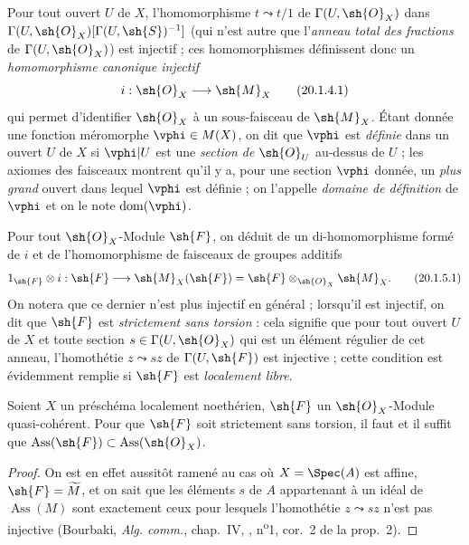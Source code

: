 \begin{env}[20.1.4]
Pour tout ouvert $U$ de $X$, l'homomorphisme $t\leadsto t/1$ de $\Gamma(U,\sh{O}_X)$ dans $\Gamma(U,\sh{O}_X)[\Gamma(U,\sh{S})^{-1}]$ (qui n'est autre que l'\emph{anneau total des fractions} de
$\Gamma(U,\sh{O}_X)$) est injectif ; ces homomorphismes définissent donc un \emph{homomorphisme canonique injectif}
\[
\label{IV.20.1.4.1}
  i:\sh{O}_X\to\sh{M}_X
  \tag{20.1.4.1}
\]
qui permet d'identifier $\sh{O}_X$ à un sous-faisceau de $\sh{M}_X$.
Étant donnée une fonction méromorphe $\vphi\in M(X)$, on dit que $\vphi$ est \emph{définie} dans un ouvert $U$ de $X$ si $\vphi|U$ est une \emph{section de $\sh{O}_U$} au-dessus de $U$ ; les axiomes des faisceaux montrent qu'il y a, pour une section $\vphi$ donnée, un \emph{plus grand} ouvert dans lequel $\vphi$ est définie ; on l'appelle \emph{domaine de définition} de $\vphi$ et on le note $\operatorname{dom}(\vphi)$.
\end{env}

\begin{env}[20.1.5]
Pour tout $\sh{O}_X$-Module $\sh{F}$, on déduit de  un di-homomorphisme formé de $i$ et de l'homomorphisme de faisceaux de groupes additifs
\[
\label{IV.20.1.5.1}
  1_{\sh{F}}\otimes i:\sh{F}\to\sh{M}_X(\sh{F})=\sh{F}\otimes_{\sh{O}_X}\sh{M}_X.
  \tag{20.1.5.1}
\]
On notera que ce dernier n'est plus injectif en général ; lorsqu'il est injectif, on dit que $\sh{F}$ est \emph{strictement sans torsion} : cela signifie que pour tout ouvert $U$ de $X$ et toute section $s\in\Gamma(U,\sh{O}_X)$ qui est un élément régulier de cet anneau, l'homothétie $z\leadsto sz$ de $\Gamma(U,\sh{F})$ est injective ; cette condition est évidemment remplie si $\sh{F}$ est \emph{localement libre}.
\end{env}

\begin{proposition}[20.1.6]
\label{IV.20.1.6}
Soient $X$ un préschéma localement noethérien, $\sh{F}$ un $\sh{O}_X$-Module quasi-cohérent.
Pour que $\sh{F}$ soit strictement sans torsion, il faut et il suffit que $\operatorname{Ass}(\sh{F})\subset\operatorname{Ass}(\sh{O}_X)$.
\end{proposition}

\begin{proof}
On est en effet aussitôt ramené au cas où $X=\Spec(A)$ est affine, $\sh{F}=\widetilde M$, et on sait que les éléments $s$ de $A$ appartenant à un idéal de $\operatorname{Ass}(M)$ sont exactement ceux pour lesquels l'homothétie $z\leadsto sz$ n'est pas injective (Bourbaki, \emph{Alg. comm.}, chap.~IV, , n\textsuperscript{o}1, cor.~2 de la prop.~2).
\end{proof}

